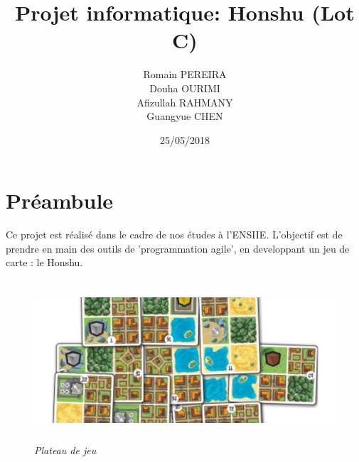 \documentclass[10pt]{article}
\title{Projet informatique: Honshu (Lot C)}
\author{
    Romain PEREIRA\\
    Douha OURIMI\\
    Afizullah RAHMANY\\
    Guangyue CHEN
  }
\date{25/05/2018}
\begin{document}
    \maketitle
    \tableofcontents
    
    \newpage
    \section*{Préambule}
    Ce projet est réalisé dans le cadre de nos études à l'ENSIIE.
    L'objectif est de prendre en main des outils de 'programmation agile',
    en developpant un jeu de carte : le Honshu.
    \newline
    \begin{figure}[H]
      \begin{center}
	\includegraphics[height=6cm,keepaspectratio]{../images/honshu.png}
      \end{center}
      \caption{\textit{Plateau de jeu}}
      \label{honshu_introduction}
    \end{figure}
    \newpage
\end{document}
